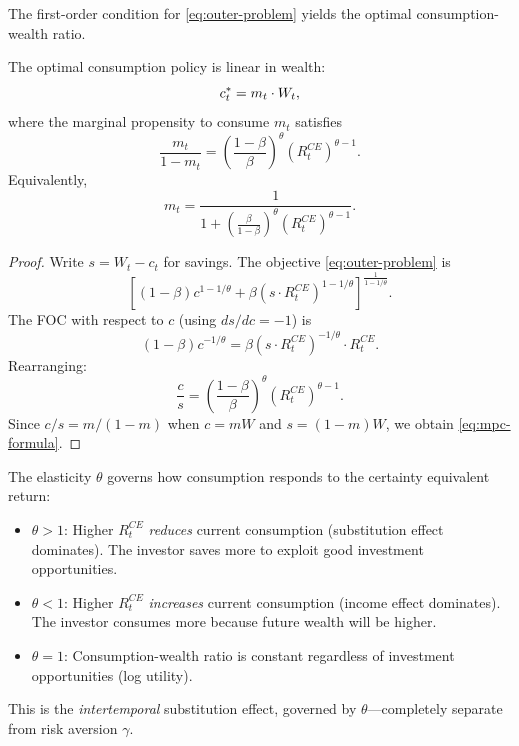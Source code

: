 The first-order condition for \eqref{eq:outer-problem} yields the optimal consumption-wealth ratio.

\begin{proposition}
\label{prop:optimal-consumption}
The optimal consumption policy is linear in wealth:
\begin{equation}
c_t^{*} = m_t \cdot W_t,
\label{eq:consumption-rule}
\end{equation}
where the marginal propensity to consume $m_t$ satisfies
\begin{equation}
\frac{m_t}{1 - m_t} = \left( \frac{1-\beta}{\beta} \right)^{\theta} \left( R_t^{CE} \right)^{\theta - 1}.
\label{eq:mpc-formula}
\end{equation}
Equivalently,
\begin{equation}
m_t = \frac{1}{1 + \left( \frac{\beta}{1-\beta} \right)^{\theta} \left( R_t^{CE} \right)^{\theta - 1}}.
\label{eq:mpc-explicit}
\end{equation}
\end{proposition}

\begin{proof}
Write $s = W_t - c_t$ for savings. The objective \eqref{eq:outer-problem} is
\[
\left[ (1-\beta) c^{1-1/\theta} + \beta (s \cdot R_t^{CE})^{1-1/\theta} \right]^{\frac{1}{1-1/\theta}}.
\]
The FOC with respect to $c$ (using $ds/dc = -1$) is
\[
(1-\beta) c^{-1/\theta} = \beta (s \cdot R_t^{CE})^{-1/\theta} \cdot R_t^{CE}.
\]
Rearranging:
\[
\frac{c}{s} = \left( \frac{1-\beta}{\beta} \right)^{\theta} (R_t^{CE})^{\theta - 1}.
\]
Since $c/s = m/(1-m)$ when $c = mW$ and $s = (1-m)W$, we obtain \eqref{eq:mpc-formula}.
\end{proof}

\begin{calloutnote}
The elasticity $\theta$ governs how consumption responds to the certainty equivalent return:
\begin{itemize}[nosep]
    \item $\theta > 1$: Higher $R_t^{CE}$ \emph{reduces} current consumption (substitution effect dominates). The investor saves more to exploit good investment opportunities.
    \item $\theta < 1$: Higher $R_t^{CE}$ \emph{increases} current consumption (income effect dominates). The investor consumes more because future wealth will be higher.
    \item $\theta = 1$: Consumption-wealth ratio is constant regardless of investment opportunities (log utility).
\end{itemize}
This is the \emph{intertemporal} substitution effect, governed by $\theta$---completely separate from risk aversion $\gamma$.
\end{calloutnote}

